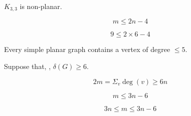 \begin{frame}{}
  \begin{theorem}
    $K_{3, 3}$ is non-planar.
  \end{theorem}


  \pause
  \[
    m \le 2n -4
  \]

  \pause
  \[
    9 \le 2 \times 6 - 4
  \]
\end{frame}

\begin{frame}{}
  \begin{theorem}
    Every simple planar graph contains a vertex of degree $\le 5$.
  \end{theorem}

  \pause
  \begin{center}
    Suppose that, , $\delta(G) \ge 6$.
  \end{center}

  \pause
  \[
    2m = \Sigma_{v} \deg(v) \ge 6n
  \]

  \pause
  \[
    m \le 3n - 6
  \]

  \pause
  \[
    3n \le m \le 3n - 6
  \]
\end{frame}
